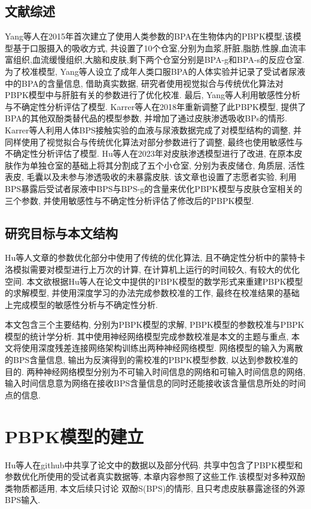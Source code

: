 \documentclass[a4paper,punct=banjiao,twoside]{ctexrep}
\theoremstyle{plain}
\theoremstyle{definition}
\theoremstyle{remark}
\begin{document}
\section{文献综述} 
Yang等人\cite{10}在2015年首次建立了使用人类参数的BPA在生物体内的PBPK模型,该模型基于口服摄入的吸收方式, 共设置了10个仓室,分别为血浆,肝脏,脂肪,性腺,血流丰富组织,血流缓慢组织,大脑和皮肤,剩下两个仓室分别是BPA-g和BPA-s的反应仓室. 为了校准模型, Yang等人设立了成年人类口服BPA的人体实验并记录了受试者尿液中的BPA的含量信息, 借助真实数据, 研究者使用视觉拟合与传统优化算法对PBPK模型中与肝脏有关的参数进行了优化校准. 最后, Yang等人利用敏感性分析与不确定性分析评估了模型.
Karrer等人\cite{9}在2018年重新调整了此PBPK模型, 提供了BPA的其他双酚类替代品的模型参数, 并增加了通过皮肤渗透吸收BPs的情形. Karrer等人利用人体BPS接触实验的血液与尿液数据完成了对模型结构的调整, 并同样使用了视觉拟合与传统优化算法对部分参数进行了调整, 最终也使用敏感性与不确定性分析评估了模型.
Hu等人\cite{11}在2023年对皮肤渗透模型进行了改进, 在原本皮肤作为单独仓室的基础上将其分割成了五个小仓室, 分别为表皮储仓, 角质层, 活性表皮, 毛囊以及未参与渗透吸收的未暴露皮肤.
该文章也设置了志愿者实验, 利用BPS暴露后受试者尿液中BPS与BPS-g的含量来优化PBPK模型与皮肤仓室相关的三个参数, 并使用敏感性与不确定性分析评估了修改后的PBPK模型.

\section{研究目标与本文结构} 

 Hu等人\cite{11}文章的参数优化部分中使用了传统的优化算法, 且不确定性分析中的蒙特卡洛模拟需要对模型进行上万次的计算, 在计算机上运行的时间较久, 有较大的优化空间. 
 本文欲根据Hu等人在论文中提供的PBPK模型的数学形式来重建PBPK模型的求解模型, 并使用深度学习的办法完成参数校准的工作, 最终在校准结果的基础上完成模型的敏感性分析与不确定性分析.

 本文包含三个主要结构, 分别为PBPK模型的求解, PBPK模型的参数校准与PBPK模型的统计学分析. 其中使用神经网络模型完成参数校准是本文的主题与重点, 本文将使用深度残差连接网络架构训练出两种神经网络模型.
网络模型的输入为离散的BPS含量信息, 输出为反演得到的需校准的PBPK模型参数, 以达到参数校准的目的. 两种神经网络模型分别为不可输入时间信息的网络和可输入时间信息的网络, 输入时间信息意为网络在接收BPS含量信息的同时还能接收该含量信息所处的时间点的信息.


\chapter{PBPK模型的建立}
Hu等人\cite{11}在github中共享了论文中的数据以及部分代码\cite{12}. 共享中包含了PBPK模型和参数优化所使用的受试者真实数据等, 本章内容参照了这些工作.该模型对多种双酚类物质都适用, 本文后续只讨论
双酚S(BPS)的情形, 且只考虑皮肤暴露途径的外源BPS输入.
\end{document}
